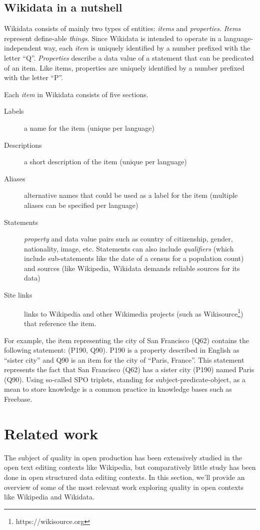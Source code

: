 \documentclass{sig-alternate-2013}
\begin{document}
\subsection{Wikidata in a nutshell}
Wikidata consists of mainly two types of entities: \textit{items} and \textit{properties}. \textit{Items} represent define-able \textit{things}. Since Wikidata is intended to operate in a language-independent way, each \textit{item} is uniquely identified by a number prefixed with the letter ``Q''.  \textit{Properties} describe a data value of a statement that can be predicated of an item.  Like items, properties are uniquely identified by a number prefixed with the letter ``P''.

Each \textit{item} in Wikidata consists of five sections.

\begin{description}
\item[Labels] a name for the item (unique per language)
\item[Descriptions] a short description of the item (unique per language)
\item[Aliases] alternative names that could be used as a label for the item (multiple aliases can be specified per language)
\item[Statements] \textit{property} and data value pairs such as country of citizenship, gender, nationality, image, etc.  Statements can also include \textit{qualifiers} (which include sub-statements like the date of a census for a population count) and sources (like Wikipedia, Wikidata demands reliable sources for its data)
\item[Site links] links to Wikipedia and other Wikimedia projects (such as Wikisource\footnote{https://wikisource.org}) that reference the item.
\end{description}

For example, the item representing the city of San Francisco (Q62) contains the following statement: (P190, Q90).  P190 is a property described in English as ``sister city'' and Q90 is an item for the city of ``Paris, France''.  This statement represents the fact that San Francisco (Q62) has a sister city (P190) named Paris (Q90). Using so-called SPO triplets, standing for subject-predicate-object, as a mean to store knowledge is a common practice in knowledge bases such as Freebase.

\section{Related work}
The subject of quality in open production has been extensively studied in the open text editing contexts like Wikipedia, but comparatively little study has been done in open structured data editing contexts. In this section, we'll provide an overview of some of the most relevant work exploring quality in open contexts like Wikipedia and Wikidata.
\end{document}
